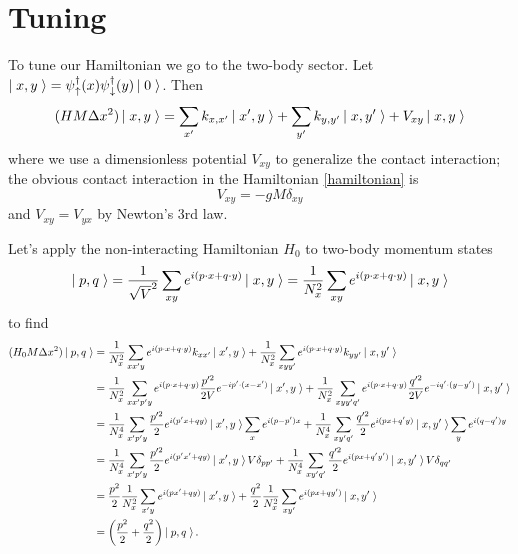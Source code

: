 \section{Tuning}\label{sec:tuning}

To tune our Hamiltonian we go to the two-body sector.
Let $\left|\;x,y\;\right\rangle = \psi{}^{\dagger}_{\uparrow}(x) \psi{}^{\dagger}_{\downarrow}(y) \left|\;0\;\right\rangle$.
Then
\begin{equation}
	(HM\Delta x^2) \left|\;x,y\;\right\rangle = \sum_{x'} k_{x,x'}\left|\;x',y\;\right\rangle + \sum_{y'} k_{y,y'}\left|\;x,y'\;\right\rangle + V_{xy} \left|\;x,y\;\right\rangle
\end{equation}
where we use a dimensionless potential $V_{xy}$ to generalize the contact interaction;
the obvious contact interaction in the Hamiltonian \eqref{hamiltonian} is
\begin{equation}
	V_{xy} = - gM \delta_{xy}
\end{equation}
and $V_{xy}=V_{yx}$ by Newton's 3rd law.

Let's apply the non-interacting Hamiltonian $H_0$ to two-body momentum states
\begin{equation}
	\left|\;p,q\;\right\rangle 
	=
	\frac{1}{\sqrt{V}^2}\sum_{xy} e^{i(p\cdot x + q \cdot y)} \left|\;x,y\;\right\rangle
	=
	\frac{1}{N_x^2}\sum_{xy} e^{i(p\cdot x + q \cdot y)} \left|\;x,y\;\right\rangle
\end{equation}
to find
\begin{align}
	(H_0 M\Delta x^2) \left|\;p,q\;\right\rangle
	&=
			\frac{1}{N_x^2} \sum_{xx'y} e^{i(p\cdot x + q \cdot y)} k_{xx'}\left|\;x',y\;\right\rangle
		+	\frac{1}{N_x^2} \sum_{xyy'} e^{i(p\cdot x + q \cdot y)} k_{yy'}\left|\;x,y'\;\right\rangle
	\\
	&=
			\frac{1}{N_x^2} \sum_{xx'p'y} e^{i(p\cdot x + q \cdot y)} \frac{p'^2}{2V} e^{-i p'\cdot(x-x')}\left|\;x',y\;\right\rangle
		+	\frac{1}{N_x^2} \sum_{xyy'q'} e^{i(p\cdot x + q \cdot y)} \frac{q'^2}{2V} e^{-i q'\cdot(y-y')}\left|\;x,y'\;\right\rangle
	\\
	&=
			\frac{1}{N_x^4} \sum_{x'p'y} \frac{p'^2}{2} e^{i(p'x+qy)} \left|\;x',y\;\right\rangle \sum_{x} e^{i(p-p')x}
		+	\frac{1}{N_x^4} \sum_{xy'q'} \frac{q'^2}{2} e^{i(px+q'y)} \left|\;x,y'\;\right\rangle \sum_{y} e^{i(q-q')y}
	\\
	&=
			\frac{1}{N_x^4} \sum_{x'p'y} \frac{p'^2}{2} e^{i(p'x'+qy)} \left|\;x',y\;\right\rangle V \delta_{pp'}
		+	\frac{1}{N_x^4} \sum_{xy'q'} \frac{q'^2}{2} e^{i(px+q'y')} \left|\;x,y'\;\right\rangle V \delta_{qq'}
	\\
	&=
			\frac{p^2}{2} \frac{1}{N_x^2}\sum_{x'y} e^{i(px'+qy)} \left|\;x',y\;\right\rangle
		+	\frac{q^2}{2} \frac{1}{N_x^2}\sum_{xy'} e^{i(px+qy')} \left|\;x,y'\;\right\rangle
	\\
	&=
		\left(\frac{p^2}{2} + \frac{q^2}{2}\right) \left|\;p,q\;\right\rangle.
\end{align}

